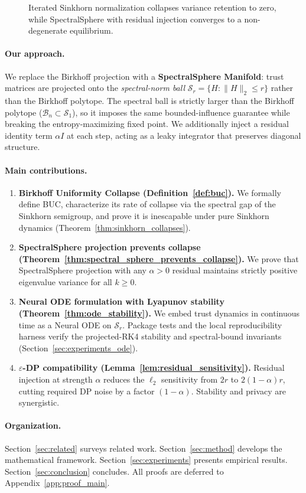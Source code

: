 \begin{figure}[t]
  \centering
  
  \caption{Iterated Sinkhorn normalization collapses variance retention to zero, while
    SpectralSphere with residual injection converges to a non-degenerate equilibrium.}
  \label{fig:birkhoff_collapse}
\end{figure}

\paragraph{Our approach.}
We replace the Birkhoff projection with a \textbf{SpectralSphere Manifold}: trust
matrices are projected onto the \emph{spectral-norm ball}
$\mathcal{S}_r = \{H : \|H\|_2 \leq r\}$ rather than the Birkhoff polytope.
The spectral ball is strictly larger than the Birkhoff polytope ($\mathcal{B}_n \subset
\mathcal{S}_1$), so it imposes the same bounded-influence guarantee while breaking the
entropy-maximizing fixed point.  We additionally inject a residual identity term
$\alpha I$ at each step, acting as a leaky integrator that preserves diagonal structure.

\paragraph{Main contributions.}
\begin{enumerate}
  \item \textbf{Birkhoff Uniformity Collapse (Definition~\ref{def:buc}).}  We formally
    define BUC, characterize its rate of collapse via the spectral gap of the
    Sinkhorn semigroup, and prove it is inescapable under pure Sinkhorn dynamics
    (Theorem~\ref{thm:sinkhorn_collapses}).
  \item \textbf{SpectralSphere projection prevents collapse
    (Theorem~\ref{thm:spectral_sphere_prevents_collapse}).}  We prove that
    SpectralSphere projection with any $\alpha > 0$ residual maintains strictly positive
    eigenvalue variance for all $k \geq 0$.
  \item \textbf{Neural ODE formulation with Lyapunov stability
    (Theorem~\ref{thm:ode_stability}).}  We embed trust dynamics in continuous time as a
    Neural ODE on $\mathcal{S}_r$.  Package tests and the local reproducibility harness
    verify the projected-RK4 stability and spectral-bound invariants
    (Section~\ref{sec:experiments_ode}).
  \item \textbf{$\varepsilon$-DP compatibility (Lemma~\ref{lem:residual_sensitivity}).}
    Residual injection at strength $\alpha$ reduces the $\ell_2$ sensitivity from $2r$
    to $2(1-\alpha)r$, cutting required DP noise by a factor $(1-\alpha)$.  Stability and
    privacy are synergistic.
\end{enumerate}

\paragraph{Organization.}
Section~\ref{sec:related} surveys related work.
Section~\ref{sec:method} develops the mathematical framework.
Section~\ref{sec:experiments} presents empirical results.
Section~\ref{sec:conclusion} concludes.
All proofs are deferred to Appendix~\ref{app:proof_main}.
